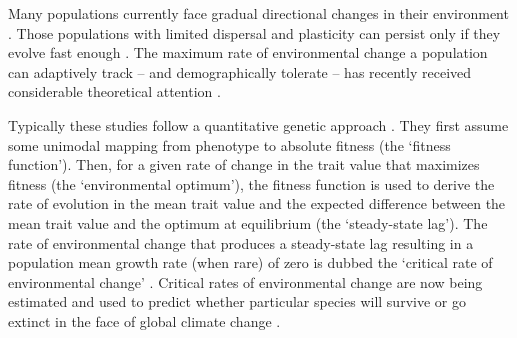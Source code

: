 \documentclass[12pt,letterpaper]{article} %
\begin{document}
Many populations currently face gradual directional changes in their environment \citep[reviewed in][]{Davis2005,Parmesan2006,Visser2008,Lavergne2010,Hoffmann2011}.
Those populations with limited dispersal and plasticity can persist only if they evolve fast enough \citep{Lynch1993}.
The maximum rate of environmental change a population can adaptively track -- and demographically tolerate -- %
has recently received considerable theoretical attention \citep[reviewed in][]{Walters2012,Kopp2013,Alexander2014}. %

Typically these studies follow a quantitative genetic approach \citep[for alternatives see][]{Johansson2008,Bertram2016,Osmond2017}.
They first assume some unimodal mapping from phenotype to absolute fitness (the `fitness function').
Then, for a given rate of change in the trait value that maximizes fitness (the `environmental optimum'), the fitness function is used to derive the rate of evolution in the mean trait value and the expected difference between the mean trait value and the optimum at equilibrium (the `steady-state lag').
The rate of environmental change that produces a steady-state lag resulting in a population mean growth rate (when rare) of zero is dubbed the `critical rate of environmental change' \citep[][]{Lynch1991}.
Critical rates of environmental change are now being estimated and used to predict whether particular species will survive or go extinct in the face of global climate change \citep{Aitken2008,Willi2009,Gienapp2013,Vedder2013}.
\end{document}
